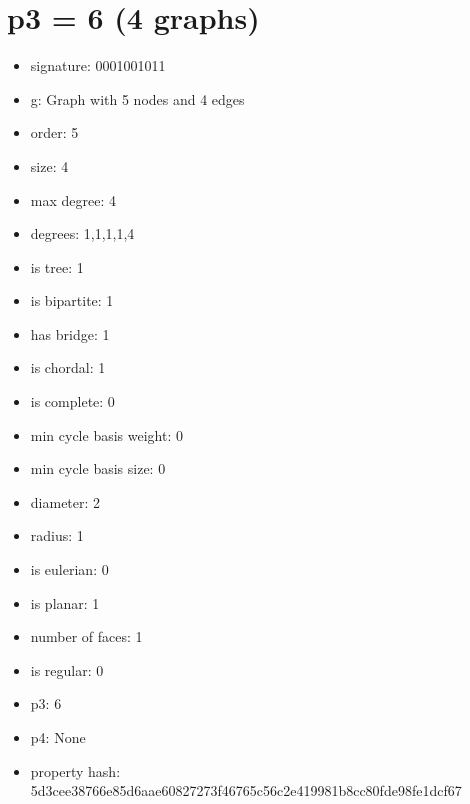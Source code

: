 \chapter{p3 = 6 (4 graphs)}
\newpage\begin{figure}
\end{figure}
\begin{itemize}
\item signature: 0001001011
\item g: Graph with 5 nodes and 4 edges
\item order: 5
\item size: 4
\item max degree: 4
\item degrees: 1,1,1,1,4
\item is tree: 1
\item is bipartite: 1
\item has bridge: 1
\item is chordal: 1
\item is complete: 0
\item min cycle basis weight: 0
\item min cycle basis size: 0
\item diameter: 2
\item radius: 1
\item is eulerian: 0
\item is planar: 1
\item number of faces: 1
\item is regular: 0
\item p3: 6
\item p4: None
\item property hash: 5d3cee38766e85d6aae60827273f46765c56c2e419981b8cc80fde98fe1dcf67
\end{itemize}
\newpage
\begin{figure}
\end{figure}
